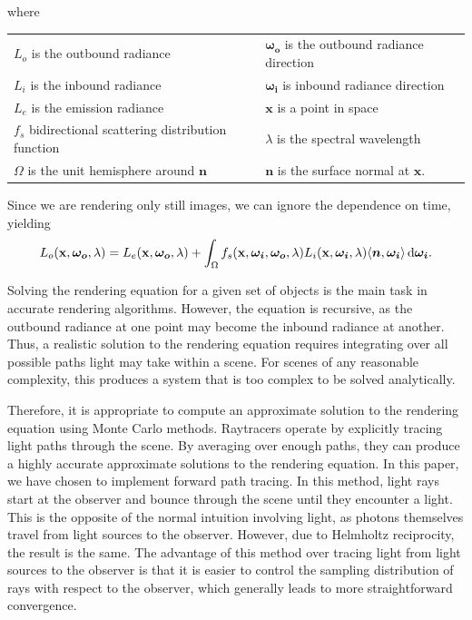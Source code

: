 \documentclass[12pt]{article}
\DeclarePairedDelimiter\ip{\langle }{\rangle}
\begin{document}
where
\begin{center}
  \begin{tabu}{ll}
    \(L_{o}\) is the outbound radiance & \(\bm{\omega_o}\) is the outbound radiance direction\\
    \(L_{i}\) is the inbound radiance & \(\bm{\omega_i}\) is inbound radiance direction\\
    \(L_{e}\) is the emission radiance & \(\mathbf x\) is a point in space\\
    \(f_s\) bidirectional scattering distribution function & \(\lambda\) is the spectral wavelength\\
    \(\Omega\) is the unit hemisphere around \(\bm n\) & \(\bm n\) is the surface normal at \(\mathbf x\).
  \end{tabu}
\end{center}
Since we are rendering only still images, we can ignore the dependence on time, yielding
\[L_{o}(\mathbf x, \bm {\omega_{o}}, \lambda) = L_{e}(\mathbf x, \bm{\omega_o}, \lambda) + \int_\Omega f_s(\mathbf x, \bm{\omega_i}, \bm{\omega_o}, \lambda)L_i(\mathbf x, \bm{\omega_i}, \lambda)\ip{\bm n, \bm{\omega_i}} \dif \bm{\omega_i}.\]

Solving the rendering equation for a given set of objects is the main task in accurate rendering algorithms.
However, the equation is recursive, as the outbound radiance at one point may become the inbound radiance at another.
Thus, a realistic solution to the rendering equation requires integrating over all possible paths light may take within a scene.
For scenes of any reasonable complexity, this produces a system that is too complex to be solved analytically.

Therefore, it is appropriate to compute an approximate solution to the rendering equation using Monte Carlo methods.
Raytracers operate by explicitly tracing light paths through the scene.
By averaging over enough paths, they can produce a highly accurate approximate solutions to the rendering equation.
In this paper, we have chosen to implement forward path tracing.
In this method, light rays start at the observer and bounce through the scene until they encounter a light.
This is the opposite of the normal intuition involving light, as photons themselves travel from light sources to the observer.
However, due to Helmholtz reciprocity, the result is the same.
The advantage of this method over tracing light from light sources to the observer is that it is easier to control the sampling distribution of rays with respect to the observer, which generally leads to more straightforward convergence.
\end{document}

